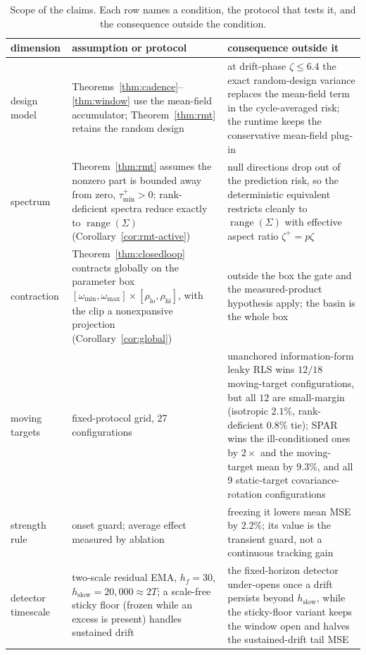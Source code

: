 \documentclass[twoside,11pt]{article}
\begin{document}
\begin{table}[t]
\centering
\footnotesize
\setlength{\tabcolsep}{4pt}
\renewcommand{\arraystretch}{0.95}
\caption{Scope of the claims. Each row names a condition, the protocol that tests it, and the consequence outside the condition.}
\label{tab:scope}
\begin{tabular}{p{1.08in}p{2.02in}p{2.5in}}
\toprule
dimension & assumption or protocol & consequence outside it \\
\midrule
design model & Theorems~\ref{thm:cadence}--\ref{thm:window} use the mean-field accumulator; Theorem~\ref{thm:rmt} retains the random design & at drift-phase $\zeta \le 6.4$ the exact random-design variance replaces the mean-field term in the cycle-averaged risk; the runtime keeps the conservative mean-field plug-in \\
spectrum & Theorem~\ref{thm:rmt} assumes the nonzero part is bounded away from zero, $\tau_{\min}^+>0$; rank-deficient spectra reduce exactly to $\operatorname{range}(\Sigma)$ (Corollary~\ref{cor:rmt-active}) & null directions drop out of the prediction risk, so the deterministic equivalent restricts cleanly to $\operatorname{range}(\Sigma)$ with effective aspect ratio $\zeta^+ = p\zeta$ \\
contraction & Theorem~\ref{thm:closedloop} contracts globally on the parameter box $[\omega_{\min},\omega_{\max}]\times[\rho_{\mathrm{lo}},\rho_{\mathrm{hi}}]$, with the clip a nonexpansive projection (Corollary~\ref{cor:global}) & outside the box the gate and the measured-product hypothesis apply; the basin is the whole box \\
moving targets & fixed-protocol grid, 27 configurations & unanchored information-form leaky RLS wins $12/18$ moving-target configurations, but all $12$ are small-margin (isotropic $2.1\%$, rank-deficient $0.8\%$ tie); SPAR wins the ill-conditioned ones by $2\times$ and the moving-target mean by $9.3\%$, and all $9$ static-target covariance-rotation configurations \\
strength rule & onset guard; average effect measured by ablation & freezing it lowers mean MSE by $2.2\%$; its value is the transient guard, not a continuous tracking gain \\
detector timescale & two-scale residual EMA, $h_f = 30$, $h_{\mathrm{slow}} = 20{,}000 \approx 2T$; a scale-free sticky floor (frozen while an excess is present) handles sustained drift & the fixed-horizon detector under-opens once a drift persists beyond $h_{\mathrm{slow}}$, while the sticky-floor variant keeps the window open and halves the sustained-drift tail MSE \\

\end{tabular}
\end{table}
\end{document}
